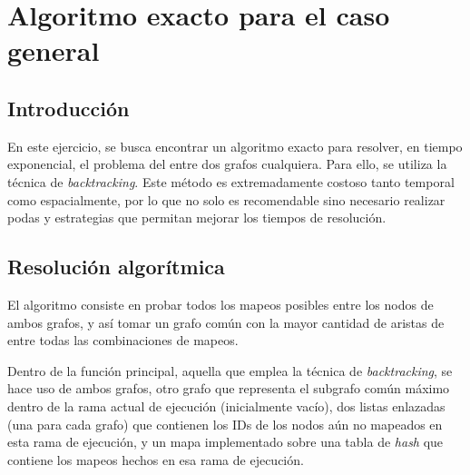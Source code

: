 \section{Algoritmo exacto para el caso general}


\subsection{Introducción}
En este ejercicio, se busca encontrar un algoritmo exacto para resolver, en
tiempo exponencial, el problema del  entre dos grafos cualquiera.
Para ello, se utiliza la técnica de \textit{backtracking}. Este método es
extremadamente costoso tanto temporal como espacialmente, por lo que no solo
es recomendable sino necesario realizar podas y estrategias que
permitan mejorar los tiempos de resolución.

\subsection{Resolución algorítmica}
El algoritmo consiste en probar todos los mapeos posibles entre los nodos de
ambos grafos, y así tomar un grafo común con la mayor cantidad de aristas de
entre todas las combinaciones de mapeos.

Dentro de la función principal, aquella que emplea la técnica de
\textit{backtracking}, se hace uso de ambos grafos, otro grafo que representa
el subgrafo común máximo dentro de la rama actual de ejecución (inicialmente
vacío), dos listas enlazadas (una para cada grafo) que contienen
los IDs de los nodos aún no mapeados en esta rama de ejecución, y un mapa
implementado sobre una tabla de \emph{hash} que contiene los mapeos hechos en esa
rama de ejecución.

\vspace{1em}

